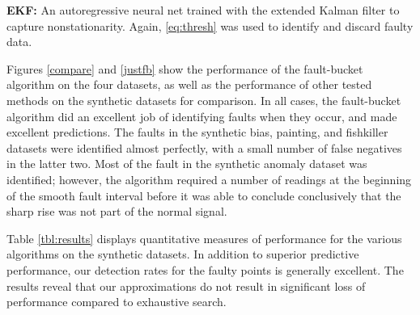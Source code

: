 \documentclass{article} %
\begin{document}
{\bf EKF:}
An autoregressive neural net trained with the extended Kalman filter to capture nonstationarity. Again, \eqref{eq:thresh} was used to identify and discard faulty data.






Figures \ref{compare} and \ref{justfb} show the performance of the
fault-bucket algorithm on the four datasets, as well as the
performance of other tested methods on the synthetic datasets for
comparison.  In all cases, the fault-bucket algorithm did an excellent
job of identifying faults when they occur, and made excellent
predictions.  The faults in the synthetic bias, painting,
and fishkiller datasets were identified almost perfectly, with a small
number of false negatives in the latter two.  Most of the fault in the
synthetic anomaly dataset was identified; however, the algorithm
required a number of readings at the beginning of the smooth fault
interval before it was able to conclude conclusively that the sharp
rise was not part of the normal signal.

Table \ref{tbl:results} displays quantitative measures of performance
for the various algorithms on the synthetic
datasets.  
In addition to superior predictive performance, our
detection rates for the faulty points is generally excellent. The results reveal that our approximations do not result in significant loss of performance compared to exhaustive search.
\end{document}
